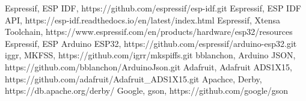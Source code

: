 \newpage
\begin{thebibliography}{999}
%	
%	
%	
%	
%
%
%
%
%
%
%
 Espressif, ESP IDF, https://github.com/espressif/esp-idf.git
 Espressif, ESP IDF API, https://esp-idf.readthedocs.io/en/latest/index.html
 Espressif, Xtensa Toolchain, \newline https://www.espressif.com/en/products/hardware/esp32/resources
Espressif, ESP Arduino ESP32, https://github.com/espressif/arduino-esp32.git
 iggr, MKFSS, https://github.com/igrr/mkspiffs.git
 bblanchon, Arduino JSON, https://github.com/bblanchon/ArduinoJson.git
 Adafruit, Adafruit ADS1X15, https://github.com/adafruit/Adafruit\_ADS1X15.git
 Apachce, Derby, https://db.apache.org/derby/
 Google, gson, https://github.com/google/gson



\end{thebibliography}
